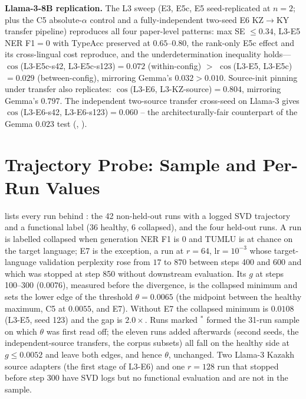 \documentclass[11pt]{article}
\begin{document}
\textbf{Llama-3-8B replication.} The L3 sweep (E3, E5c, E5 seed-replicated at $n{=}2$; plus the C5 absolute-$\alpha$ control and a fully-independent two-seed E6 KZ$\rightarrow$KY transfer pipeline) reproduces all four paper-level patterns: max SE $\leq 0.34$, L3-E5 NER F1$=0$ with TypeAcc preserved at $0.65$--$0.80$, the rank-only E5c effect and its cross-lingual cost reproduce, and the underdetermination inequality holds---$\cos$(L3-E5c-s42, L3-E5c-s123)$=0.072$ (within-config) $>$ $\cos$(L3-E5, L3-E5c)$=0.029$ (between-config), mirroring Gemma's $0.032 > 0.010$. Source-init pinning under transfer also replicates: $\cos$(L3-E6, L3-KZ-source)$=0.804$, mirroring Gemma's $0.797$. The independent two-source transfer cross-seed on Llama-3 gives $\cos$(L3-E6-s42, L3-E6-s123)$=0.060$ -- the architecturally-fair counterpart of the Gemma $0.023$ test (, ).

\section{Trajectory Probe: Sample and Per-Run Values}
\label{app:probe_sample}

 lists every run behind : the 42 non-held-out runs with a logged SVD trajectory and a functional label (36 healthy, 6 collapsed), and the four held-out runs. A run is labelled collapsed when generation NER F1 is $0$ and TUMLU is at chance on the target language; E7 is the exception, a run at $r{=}64$, $\text{lr}{=}10^{-3}$ whose target-language validation perplexity rose from $17$ to $870$ between steps 400 and 600 and which was stopped at step 850 without downstream evaluation. Its $g$ at steps 100--300 ($0.0076$), measured before the divergence, is the collapsed minimum and sets the lower edge of the threshold $\theta{=}0.0065$ (the midpoint between the healthy maximum, C5 at $0.0055$, and E7). Without E7 the collapsed minimum is $0.0108$ (L3-E5, seed 123) and the gap is $2.0\times$. Runs marked $^\ast$ formed the 31-run sample on which $\theta$ was first read off; the eleven runs added afterwards (second seeds, the independent-source transfers, the corpus subsets) all fall on the healthy side at $g \le 0.0052$ and leave both edges, and hence $\theta$, unchanged. Two Llama-3 Kazakh source adapters (the first stage of L3-E6) and one $r{=}128$ run that stopped before step 300 have SVD logs but no functional evaluation and are not in the sample.
\end{document}
